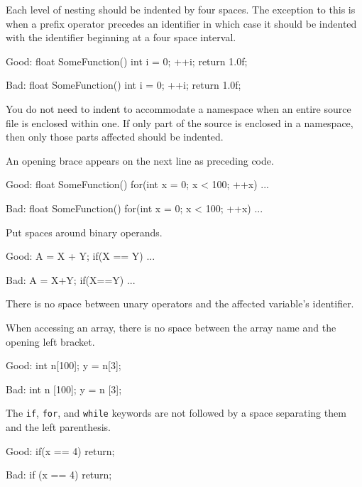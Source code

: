 \item
Each level of nesting should be indented by four spaces. The exception to this is when a prefix operator precedes an identifier in which case it should be indented with the identifier beginning at a four space interval.

Good:
\startCodeExample
float SomeFunction()
{
    int i = 0;
  ++i;
    return 1.0f;
}
\stopCodeExample

Bad:
\startCodeExample
float SomeFunction()
{
    int i = 0;
    ++i;
    return 1.0f;
}
\stopCodeExample

\item
You do not need to indent to accommodate a namespace when an entire source file is enclosed within one. If only part of the source is enclosed in a namespace, then only those parts affected should be indented.

\item
An opening brace appears on the next line as preceding code.

Good:
\startCodeExample
float SomeFunction()
{
    for(int x = 0; x < 100; ++x)
    {
        ...
    }
}
\stopCodeExample

Bad:
\startCodeExample
float SomeFunction() {
    for(int x = 0; x < 100; ++x) {
        ...
    }
}
\stopCodeExample

\item
Put spaces around binary operands.

Good:
\startCodeExample
A = X + Y;
if(X == Y)
    ...
\stopCodeExample

Bad:
\startCodeExample
A = X+Y;
if(X==Y)
    ...
\stopCodeExample

\item
There is no space between unary operators and the affected variable's identifier.

\item
When accessing an array, there is no space between the array name and the opening left bracket. 

Good:
\startCodeExample
int n[100];
y = n[3];
\stopCodeExample

Bad:
\startCodeExample
int n [100];
y = n [3];
\stopCodeExample

\item
The {\tt if}, {\tt for}, and {\tt while} keywords are not followed by a space separating them and the left parenthesis. 

Good:
\startCodeExample
if(x == 4)
    return;
\stopCodeExample

Bad:
\startCodeExample
if (x == 4)
    return;
\stopCodeExample

